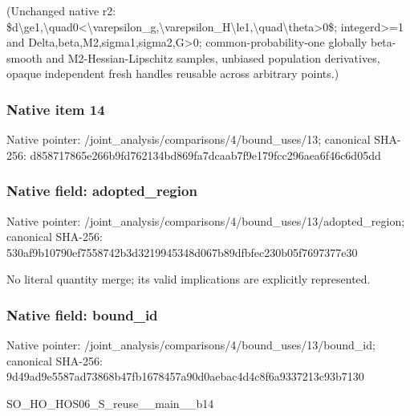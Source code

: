 \documentclass[10pt,a4paper]{article}
\begin{document}
\begingroup\raggedright\sloppy (Unchanged native r2:\allowbreak{} \$d\textbackslash{}ge1,\allowbreak{}\textbackslash{}quad0<\textbackslash{}varepsilon\_\allowbreak{}g,\allowbreak{}\textbackslash{}varepsilon\_\allowbreak{}H\textbackslash{}le1,\allowbreak{}\textbackslash{}quad\textbackslash{}theta>0\$;\allowbreak{} integerd>=\allowbreak{}1 and Delta,\allowbreak{}beta,\allowbreak{}M2,\allowbreak{}sigma1,\allowbreak{}sigma2,\allowbreak{}G>0;\allowbreak{} common-probability-one globally beta-smooth and M2-Hessian-Lipschitz samples,\allowbreak{} unbiased population derivatives,\allowbreak{} opaque independent fresh handles reusable across arbitrary points.)\par\endgroup

\subsubsection{Native item 14}
Native pointer: /joint\_\allowbreak{}analysis/comparisons/4/bound\_\allowbreak{}uses/13; canonical SHA-256: d858717865e266b9fd762134bd869fa7dcaab7f9e179fcc296aea6f46c6d05dd

\subsubsection{Native field: adopted\_\allowbreak{}region}
Native pointer: /joint\_\allowbreak{}analysis/comparisons/4/bound\_\allowbreak{}uses/13/adopted\_\allowbreak{}region; canonical SHA-256: 530af9b10790ef7558742b3d3219945348d067b89dfbfec230b05f7697377e30

\begingroup\raggedright\sloppy No literal quantity merge;\allowbreak{} its valid implications are explicitly represented.\par\endgroup

\subsubsection{Native field: bound\_\allowbreak{}id}
Native pointer: /joint\_\allowbreak{}analysis/comparisons/4/bound\_\allowbreak{}uses/13/bound\_\allowbreak{}id; canonical SHA-256: 9d49ad9e5587ad73868b47fb1678457a90d0aebac4d4c8f6a9337213c93b7130

\begingroup\raggedright\sloppy SO\_\allowbreak{}HO\_\allowbreak{}HOS06\_\allowbreak{}S\_\allowbreak{}reuse\_\allowbreak{}\_\allowbreak{}main\_\allowbreak{}\_\allowbreak{}b14\par\endgroup
\end{document}
